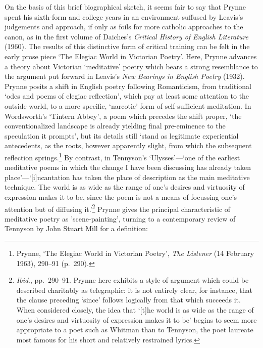 \documentclass[]{article}
\begin{document}
On the basis of this brief biographical sketch, it seems fair to say
that Prynne spent his sixth-form and college years in an environment
suffused by Leavis's judgements and approach, if only as foils for more
catholic approaches to the canon, as in the first volume of Daiches's
\emph{Critical History of English Literature} (1960). The results of
this distinctive form of critical training can be felt in the early
prose piece `The Elegiac World in Victorian Poetry'. Here, Prynne
advances a theory about Victorian `meditative' poetry which bears a
strong resemblance to the argument put forward in Leavis's \emph{New
Bearings in English Poetry} (1932). Prynne posits a shift in English
poetry following Romanticism, from traditional `odes and poems of
elegiac reflection', which pay at least some attention to the outside
world, to a more specific, `narcotic' form of self-sufficient
meditation. In Wordsworth's `Tintern Abbey', a poem which precedes the
shift proper, `the conventionalized landscape is already yielding final
pre-eminence to the speculation it prompts', but its details still
`stand as legitimate experiential antecedents, as the roots, however
apparently slight, from which the subsequent reflection
springs.\footnote{Prynne, `The Elegiac World in Victorian Poetry',
  \emph{The Listener} (14 February 1963), 290--91 (p.~290).} By
contrast, in Tennyson's `Ulysses'---`one of the earliest meditative
poems in which the change I have been discussing has already taken
place'---`{[}i{]}ncantation has taken the place of description as the
main meditative technique. The world is as wide as the range of one's
desires and virtuosity of expression makes it to be, since the poem is
not a means of focussing one's attention but of diffusing it.'\footnote{\emph{Ibid}.,
  pp.~290--91. Prynne here exhibits a style of argument which could be
  described charitably as telegraphic: it is not entirely clear, for
  instance, that the clause preceding `since' follows logically from
  that which succeeds it. When considered closely, the idea that
  `{[}t{]}he world is as wide as the range of one's desires and
  virtuosity of expression makes it to be' begins to seem more
  appropriate to a poet such as Whitman than to Tennyson, the poet
  laureate most famous for his short and relatively restrained lyrics.}
Prynne gives the principal characteristic of meditative poetry as
'scene-painting', turning to a contemporary review of Tennyson by John
Stuart Mill for a definition:
\end{document}
